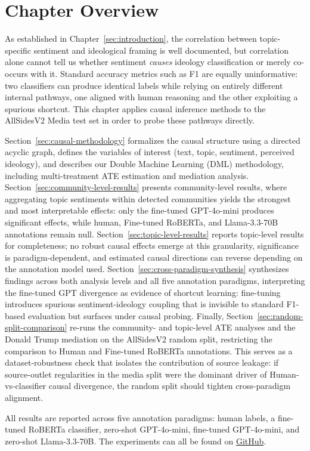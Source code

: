 \section{Chapter Overview}
\label{sec:causal-background}

As established in Chapter~\ref{sec:introduction}, the correlation between topic-specific sentiment and ideological framing is well documented, but correlation alone cannot tell us whether sentiment \emph{causes} ideology classification or merely co-occurs with it. Standard accuracy metrics such as F1 are equally uninformative: two classifiers can produce identical labels while relying on entirely different internal pathways, one aligned with human reasoning and the other exploiting a spurious shortcut. This chapter applies causal inference methods to the AllSidesV2 Media test set in order to probe these pathways directly.

Section~\ref{sec:causal-methodology} formalizes the causal structure using a directed acyclic graph, defines the variables of interest (text, topic, sentiment, perceived ideology), and describes our Double Machine Learning (DML) methodology, including multi-treatment ATE estimation and mediation analysis. Section~\ref{sec:community-level-results} presents community-level results, where aggregating topic sentiments within detected communities yields the strongest and most interpretable effects: only the fine-tuned GPT-4o-mini produces significant effects, while human, Fine-tuned RoBERTa, and Llama-3.3-70B annotations remain null. Section~\ref{sec:topic-level-results} reports topic-level results for completeness; no robust causal effects emerge at this granularity, significance is paradigm-dependent, and estimated causal directions can reverse depending on the annotation model used. Section~\ref{sec:cross-paradigm-synthesis} synthesizes findings across both analysis levels and all five annotation paradigms, interpreting the fine-tuned GPT divergence as evidence of shortcut learning: fine-tuning introduces spurious sentiment-ideology coupling that is invisible to standard F1-based evaluation but surfaces under causal probing. Finally, Section~\ref{sec:random-split-comparison} re-runs the community- and topic-level ATE analyses and the Donald Trump mediation on the AllSidesV2 random split, restricting the comparison to Human and Fine-tuned RoBERTa annotations. This serves as a dataset-robustness check that isolates the contribution of source leakage: if source-outlet regularities in the media split were the dominant driver of Human-vs-classifier causal divergence, the random split should tighten cross-paradigm alignment.

All results are reported across five annotation paradigms: human labels, a fine-tuned RoBERTa classifier, zero-shot GPT-4o-mini, fine-tuned GPT-4o-mini, and zero-shot Llama-3.3-70B. The experiments can all be found on \href{https://github.com/upasanachatterjee/causal-inference-on-text}{GitHub}.
